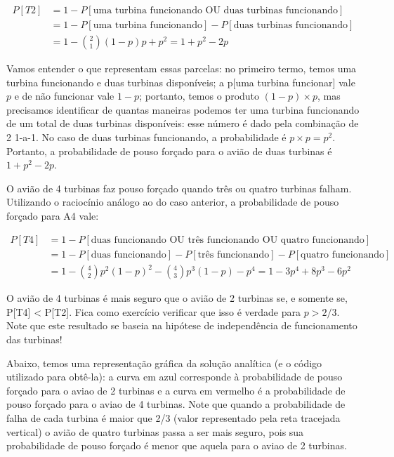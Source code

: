 \documentclass[
]{book}
\theoremstyle{definition}
\theoremstyle{definition}
\theoremstyle{definition}
\theoremstyle{remark}
\begin{document}
\begin{align*}
P[T2]
&= 1 - P[\text{uma turbina funcionando OU duas turbinas funcionando}]\\
&= 1 - P[\text{uma turbina funcionando}] - P[\text{duas turbinas funcionando}]\\
&= {1-{{2}\choose{1}}(1-p)p + p^2 = 1 + p^2 - 2p}
\end{align*}

Vamos entender o que representam essas parcelas: no primeiro termo, temos uma turbina funcionando e duas turbinas disponíveis; a p{[}uma turbina funcionar{]} vale \(p\) e de não funcionar vale \(1-p\); portanto, temos o produto \((1-p) \times p\), mas precisamos identificar de quantas maneiras podemos ter uma turbina funcionando de um total de duas turbinas disponíveis: esse número é dado pela combinação de 2 1-a-1. No caso de duas turbinas funcionando, a probabilidade é \(p \times p = p^2\). Portanto, a probabilidade de pouso forçado para o avião de duas turbinas é \(1 + p^2 - 2p\).

O avião de 4 turbinas faz pouso forçado quando três ou quatro turbinas falham. Utilizando o raciocínio análogo ao do caso anterior, a probabilidade de pouso forçado para A4 vale:

\begin{align*}
P[T4] 
&= 1 - P[\text{duas funcionando OU três funcionando OU quatro  funcionando}]\\
&= 1 - P[\text{duas funcionando}] - P[\text{três funcionando}] - P[\text{quatro funcionando}]\\
&= 1 - {{4}\choose{2}}p^2(1-p)^2 - {{4}\choose{3}}p^3(1-p) - p^4 = 1 - 3p^4 + 8 p^3 - 6p^2
\end{align*}

O avião de 4 turbinas é mais seguro que o avião de 2 turbinas se, e somente se, P{[}T4{]} \textless{} P{[}T2{]}. Fica como exercício verificar que isso é verdade para \(p > 2/3\). Note que este resultado se baseia na hipótese de independência de funcionamento das turbinas!

Abaixo, temos uma representação gráfica da solução analítica (e o código utilizado para obtê-la): a curva em azul corresponde à probabilidade de pouso forçado para o aviao de 2 turbinas e a curva em vermelho é a probabilidade de pouso forçado para o aviao de 4 turbinas. Note que quando a probabilidade de falha de cada turbina é maior que 2/3 (valor representado pela reta tracejada vertical) o avião de quatro turbinas passa a ser mais seguro, pois sua probabilidade de pouso forçado é menor que aquela para o aviao de 2 turbinas.
\end{document}
